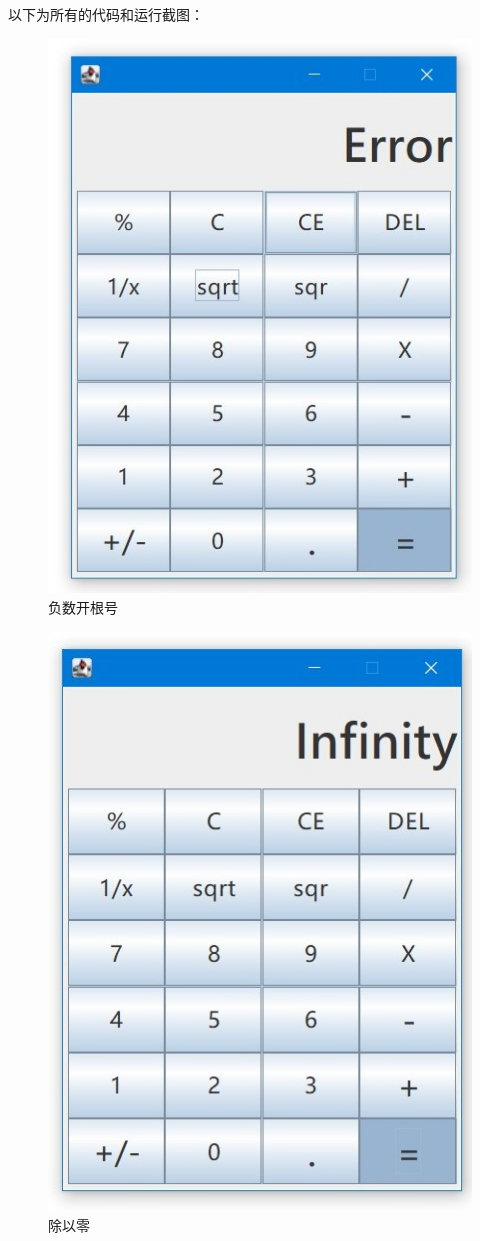 \documentclass{ctexart}
\begin{document}
以下为所有的代码和运行截图：

\begin{figure}[htbp]
    \centering
    \caption{负数开根号}\label{fig:2}
    \includegraphics[scale=0.7]{3.jpg}
\end{figure}
\newpage
\begin{figure}[htbp]
    \centering
    \caption{除以零}\label{fig:3}
    \includegraphics[scale=0.50]{4.jpg} 
\end{figure}
\end{document}
